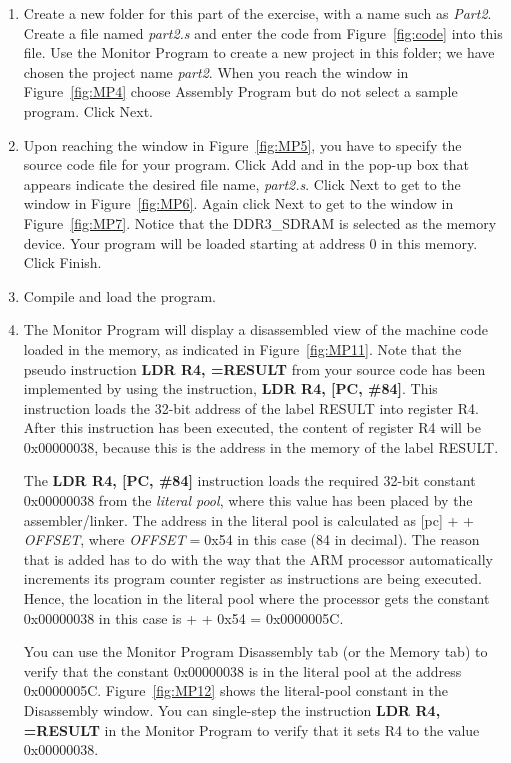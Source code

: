 \documentclass[epsfig,10pt,fullpage]{article}
\begin{document}
\begin{enumerate}
\item Create a new folder for this part of the exercise, with a name such as {\it Part2}.  
Create a file named {\it part2.s} and enter the code from Figure~\ref{fig:code} into this
file.  Use the Monitor Program to create a new project in this folder; we have chosen the 
project name {\it part2}.  When you reach the window in Figure~\ref{fig:MP4} 
choose {\sf Assembly Program} but do not select a sample program. Click {\sf Next}.
\item Upon reaching the window in Figure~\ref{fig:MP5}, you have to specify the source
		  code file for your program.
Click {\sf Add} and in the pop-up box that appears indicate the desired file name,
{\it part2.s}.  Click {\sf Next} to get to the window in Figure~\ref{fig:MP6}. 
Again click {\sf Next} to get to the window in Figure~\ref{fig:MP7}. Notice that the 
DDR3\_SDRAM is selected as the memory device.  Your program will be loaded starting at
address 0 in this memory.  Click {\sf Finish}.
\item Compile and load the program.

\item The Monitor Program will display a disassembled view of the machine code loaded
in the memory, as indicated in Figure~\ref{fig:MP11}. 
Note that the pseudo instruction {\bf LDR R4, =RESULT} from your source code
has been implemented by using the instruction, {\bf LDR R4, [PC, \#84]}.
This instruction loads the 32-bit address of the label RESULT into register R4. 
After this instruction has been executed, the content of register R4 will be 
{\sf 0x00000038}, because this is the address in the memory of the label RESULT.

The {\bf LDR R4, [PC, \#84]} instruction loads the required 32-bit constant 
{\sf 0x00000038} from the {\it literal pool}, where this value has been placed by the 
assembler/linker. The address in the literal pool is calculated as [pc] + {} + 
{\it OFFSET}, where {\it OFFSET}$ = ${\sf 0x54} in this case (84 in decimal). The reason 
that {} is added has to do with the way that the ARM processor automatically
increments its program counter register as instructions are being executed.
Hence, the location in the literal pool where the processor gets the constant 
{\sf 0x00000038} in this case is {} + {} + {\sf 0x54} = {\sf 0x0000005C}.

You can use the Monitor Program Disassembly tab (or the Memory tab) to verify that the 
constant {\sf 0x00000038} is in the literal pool at the address {\sf 0x0000005C}. 
Figure~\ref{fig:MP12} shows the literal-pool constant in the Disassembly window.
You can single-step the instruction {\bf LDR R4, =RESULT} in the Monitor Program to verify
that it sets R4 to the value {\sf 0x00000038}.


\end{enumerate}
\end{document}
